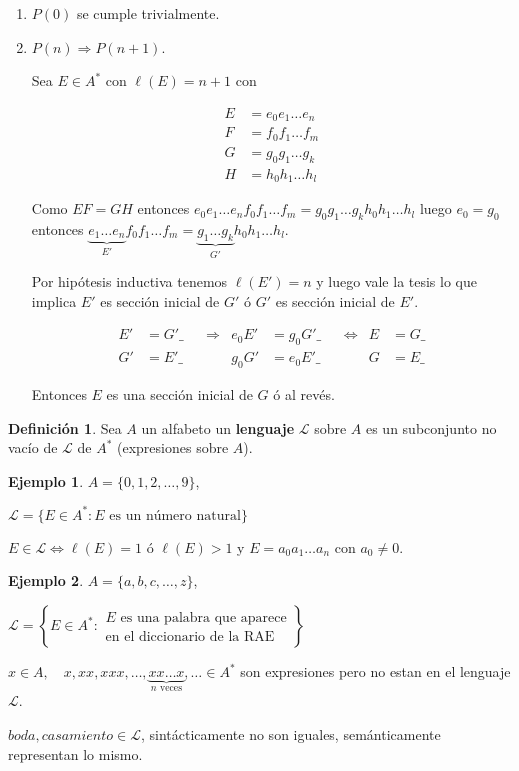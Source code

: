 \documentclass[a4paper,11pt]{article}
\theoremstyle{definition}
\newtheorem{defn}{Definición}[section]
\newtheorem{exap}{Ejemplo}[section]
\theoremstyle{remark}
\begin{document}
\begin{enumerate}
\item $P(0)$ se cumple trivialmente.
\item $P(n) \Rightarrow P(n+1)$.

Sea $E \in A^*$ con $\ell(E) = n+1$ con 

\begin{align*}
E &= e_0e_1\dots e_n \\
F &= f_0f_1\dots f_m \\
G &= g_0g_1\dots g_k \\
H &= h_0h_1\dots h_l
\end{align*}

Como $EF = GH$ entonces $e_0e_1\dots e_nf_0f_1\dots f_m = g_0g_1\dots g_kh_0h_1\dots h_l$
luego $e_0 = g_0$ entonces $\underbrace{e_1\dots e_n}_{E'}f_0f_1\dots f_m 
= \underbrace{g_1\dots g_k}_{G'}h_0h_1\dots h_l$.

Por hipótesis inductiva tenemos $\ell(E') = n$ y luego vale la tesis 
lo que implica $E'$ es sección inicial de $G'$ ó $G'$ es sección
inicial de $E'$.

\begin{align*}
E' &= G'\_ & &\Rightarrow & e_0E' &= g_0 G'\_ & &\iff & E &= G\_\\
G' &= E'\_ & & & g_0 G' &= e_0 E'\_ & & & G &= E\_
\end{align*}

Entonces $E$ es una sección inicial de $G$ ó al revés.
\end{enumerate}

\begin{defn}
Sea $A$ un alfabeto un \textbf{lenguaje} $\mathcal L$ sobre $A$ 
es un subconjunto no vacío de $\mathcal L$ de $A^*$ (expresiones sobre $A$).
\end{defn}

\begin{exap}
$A = \{0, 1, 2, \dots, 9\}$, 

$\mathcal L = \{ E \in A^* : 
E \textrm{ es un número natural} \}$

$E \in \mathcal L \iff \ell(E) = 1$ ó $\ell(E) > 1$ y 
$E = a_0a_1\dots a_n$ con $a_0 \ne 0$.
\end{exap}

\begin{exap}
$A = \{a, b, c, \dots, z\}$, 

$\mathcal L = \left\{ E \in A^* : 
\substack{E \text{ es una palabra que aparece} \\ \text{en el diccionario de la RAE}}\right\}$

$x \in A,\quad x, xx, xxx, \dots, \underbrace{xx\dots x}_{n\textrm{ veces}} 
, \dots\in A^*$ son expresiones pero no estan en el lenguaje $\mathcal L$.

$boda, casamiento \in \mathcal L$, sintácticamente no son iguales,
semánticamente representan lo mismo.
\end{exap}
\end{document}
